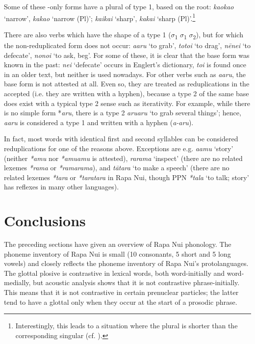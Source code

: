 Some of these -only forms have a plural of type 1, based on the root: \textit{kaokao} ‘narrow’, \textit{kakao} ‘narrow (Pl)’; \textit{ka{\ꞌ}ika{\ꞌ}i} ‘sharp’, \textit{kaka{\ꞌ}i} ‘sharp (Pl)’.\footnote{\label{fn:85}Interestingly, this leads to a situation where the plural is shorter than the corresponding singular (cf. \citealt[40]{Blust2001}).}

There are also verbs which have the shape of a type 1  ($\sigma $\textsubscript{1} $\sigma $\textsubscript{1} $\sigma $\textsubscript{2}), but for which the non-reduplicated form does not occur: \textit{{\ꞌ}a{\ꞌ}aru} ‘to grab’, \textit{totoi} ‘to drag’, \textit{nēne{\ꞌ}i} ‘to defecate’, \textit{nono{\ꞌ}i} ‘to ask, beg’. For some of these, it is clear that the base form was known in the past: \textit{ne{\ꞌ}i} ‘defecate’ occurs in Englert’s dictionary, \textit{toi} is found once in an older text, but neither is used nowadays. For other verbs such as \textit{{\ꞌ}a{\ꞌ}aru}, the base form is not attested at all. Even so, they are treated as reduplications in the accepted  (i.e. they are written with a hyphen), because a type 2  of the same base does exist with a typical type 2 sense such as iterativity. For example, while there is no simple form *\textit{{\ꞌ}aru}, there is a type 2  \textit{{\ꞌ}aru{\ꞌ}aru} ‘to grab several things’; hence, \textit{{\ꞌ}a{\ꞌ}aru} is considered a type 1  and written with a hyphen (\textit{{\ꞌ}a\nobreakdash-{\ꞌ}aru}). 

In fact, most words with identical first and second syllables can be considered reduplications for one of the reasons above. Exceptions are e.g. \textit{{\ꞌ}a{\ꞌ}amu} ‘story’ (neither \textit{*{\ꞌ}amu} nor \textit{*{\ꞌ}amu{\ꞌ}amu} is attested), \textit{rarama} ‘inspect’ (there are no related lexemes \textit{*rama} or \textit{*rama\-rama}), and \textit{tātara} ‘to make a speech’ (there are no related lexemes \textit{*tara} or \textit{*taratara} in Rapa Nui, though PPN \textit{*tala} ‘to talk; story’ has reflexes in many other languages).
\section{Conclusions}\label{sec:2.7}

The preceding sections have given an overview of Rapa Nui phonology. The phoneme inventory of Rapa Nui is small (10 consonants, 5 short and 5 long vowels) and closely reflects the phoneme inventory of Rapa Nui’s protolanguages. The glottal plosive is contrastive in lexical words, both word-initially and word-medially, but acoustic analysis shows that it is not contrastive phrase-initially. This means that it is not contrastive in certain prenuclear particles; the latter tend to have a glottal only when they occur at the start of a prosodic phrase.

